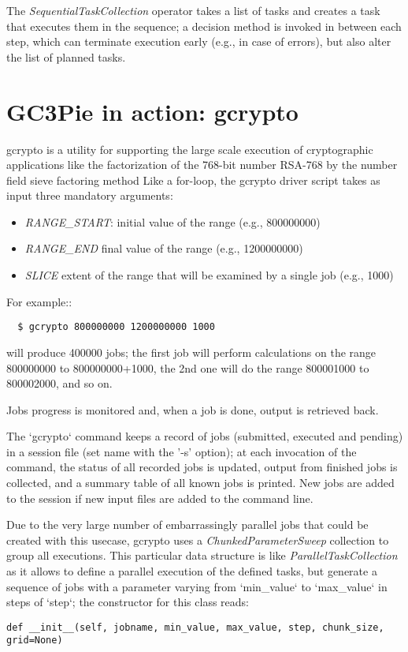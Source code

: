\documentclass{PoS}
\begin{document}
The \emph{SequentialTaskCollection} operator takes a list of tasks and
creates a task that executes them in the sequence; a decision method
is invoked in between each step, which can terminate execution early
(e.g., in case of errors), but also alter the list of planned tasks.


\section{GC3Pie in action: gcrypto}
gcrypto is a utility for supporting the large scale execution of
cryptographic applications like the factorization of the 768-bit
number RSA-768 by the number field sieve factoring method \cite{hetero2012}
Like a for-loop, the gcrypto driver script takes as input three
mandatory arguments:
\begin{itemize}
\item{\it RANGE\_START}: initial value of the range (e.g., 800000000)
\item{\it RANGE\_END} final value of the range (e.g., 1200000000)
\item{\it SLICE} extent of the range that will be examined by a single
  job (e.g., 1000)
\end{itemize}

For example::
\begin{verbatim}
  $ gcrypto 800000000 1200000000 1000
\end{verbatim}

will produce 400000 jobs; the first job will perform calculations
on the range 800000000 to 800000000+1000, the 2nd one will do the
range 800001000 to 800002000, and so on.

Jobs progress is monitored and, when a job is done, output is
retrieved back.

The `gcrypto` command keeps a record of jobs (submitted, executed and
pending) in a session file (set name with the '-s' option); at each
invocation of the command, the status of all recorded jobs is updated,
output from finished jobs is collected, and a summary table of all
known jobs is printed.  New jobs are added to the session if new input
files are added to the command line.

Due to the very large number of embarrassingly parallel jobs that could be
created with this usecase, gcrypto uses a {\it ChunkedParameterSweep}
collection to group all executions. This particular data structure is
like {\it ParallelTaskCollection} as it allows to define a parallel
execution of the defined tasks, but generate a sequence of jobs with a
parameter varying from `min\_value` to `max\_value` in steps of `step`;
the constructor for this class reads:
\begin{verbatim}
def __init__(self, jobname, min_value, max_value, step, chunk_size,
grid=None)
\end{verbatim}
\end{document}
